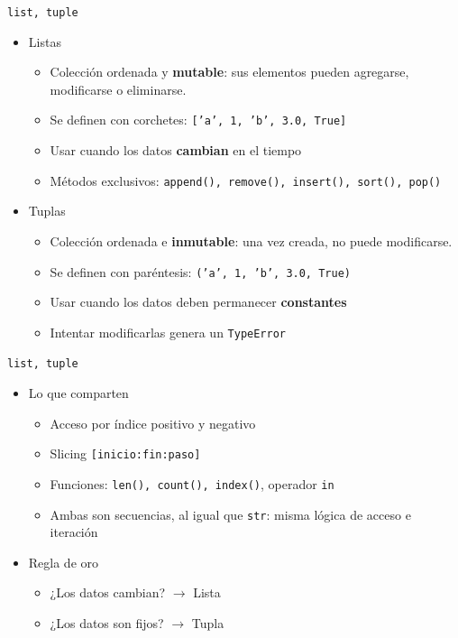 \documentclass{beamer}
\begin{document}
    \begin{frame}[fragile,t]{\texttt{list, tuple}}
        \begin{itemize}
            \item Listas
            \begin{itemize}
                \item Colección ordenada y \textbf{mutable}: sus elementos pueden agregarse, modificarse o eliminarse.
                \item Se definen con corchetes: \texttt{['a', 1, 'b', 3.0, True]}
                \item Usar cuando los datos \textbf{cambian} en el tiempo
                \item Métodos exclusivos: \texttt{append(), remove(), insert(), sort(), pop()}
            \end{itemize}
            \item Tuplas
            \begin{itemize}
                \item Colección ordenada e \textbf{inmutable}: una vez creada, no puede modificarse.
                \item Se definen con paréntesis: \texttt{('a', 1, 'b', 3.0, True)}
                \item Usar cuando los datos deben permanecer \textbf{constantes}
                \item Intentar modificarlas genera un \texttt{TypeError}
            \end{itemize}
        \end{itemize}
    \end{frame}

    \begin{frame}[fragile,t]{\texttt{list, tuple}}
        \begin{itemize}
            \item Lo que comparten
            \begin{itemize}
                \item Acceso por índice positivo y negativo
                \item Slicing \texttt{[inicio:fin:paso]}
                \item Funciones: \texttt{len(), count(), index()}, operador \texttt{in}
                \item Ambas son secuencias, al igual que \texttt{str}: misma lógica de acceso e iteración
            \end{itemize}
            \item Regla de oro
            \begin{itemize}
                \item ¿Los datos cambian? $\rightarrow$ Lista
                \item ¿Los datos son fijos? $\rightarrow$ Tupla
            \end{itemize}
        \end{itemize}
    \end{frame}
    
\end{document}
